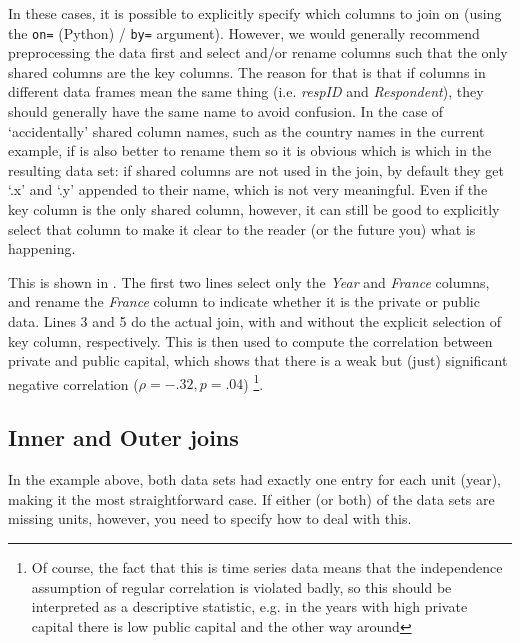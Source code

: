 In these cases, it is possible to explicitly specify which columns to join on (using the \verb+on=+ (Python) / \verb+by=+ argument).
However, we would generally recommend preprocessing the data first and select and/or rename columns such that the only shared columns are the key columns.
The reason for that is that if columns in different data frames mean the same thing (i.e. \emph{respID} and \emph{Respondent}), they should generally have the same name to avoid confusion.
In the case of `accidentally' shared column names, such as the country names in the current example,
if is also better to rename them so it is obvious which is which in the resulting data set:
if shared columns are not used in the join, by default they get `.x' and `.y' appended to their name, which is not very meaningful.
Even if the key column is the only shared column, however, it can still be good to explicitly select that column to make it clear to the reader (or the future you) what is happening. 




This is shown in .
The first two lines select only the \emph{Year} and \emph{France} columns, and rename the \emph{France} column to indicate whether it is the private or public data.
Lines 3 and 5 do the actual join, with and without the explicit selection of key column, respectively.
This is then used to compute the correlation between private and public capital, 
which shows that there is a weak but (just) significant negative correlation ($\rho=-.32, p=.04$)%
\footnote{Of course, the fact that this is time series data means that the independence assumption of regular correlation is violated badly, so this should be interpreted as a descriptive statistic, e.g. in the years with high private capital there is low public capital and the other way around}.

\subsection{Inner and Outer joins}

In the example above, both data sets had exactly one entry for each unit (year), making it the most straightforward case.
If either (or both) of the data sets are missing units, however, you need to specify how to deal with this.

